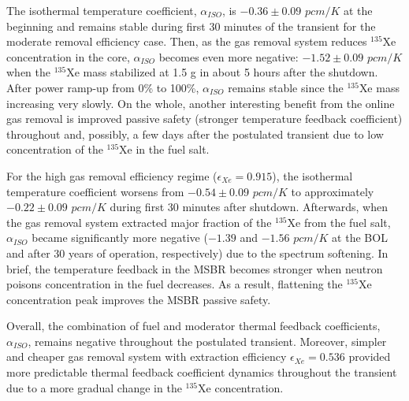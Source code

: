 The isothermal temperature coefficient, $\alpha_{ISO}$, is $-0.36\pm0.09$ 
$pcm/K$ at the beginning and remains stable during first 30 minutes of the 
transient for the moderate removal efficiency case.  Then, as the gas removal 
system reduces $^{135}$Xe concentration in the core, $\alpha_{ISO}$ becomes 
even more negative: $-1.52\pm0.09$ $pcm/K$ when the $^{135}$Xe mass stabilized 
at 1.5 g in about 5 hours after the shutdown. After power ramp-up from 0\% to 
100\%, $\alpha_{ISO}$ remains stable since the $^{135}$Xe mass increasing very 
slowly. On the whole, another interesting benefit from the online gas removal 
is improved passive safety (stronger temperature feedback coefficient) 
throughout and, possibly, a few days after the postulated transient due to low 
concentration of the $^{135}$Xe in the fuel salt.

For the high gas removal efficiency regime ($\epsilon_{Xe}=0.915$), the 
isothermal temperature coefficient worsens from $-0.54\pm0.09$ $pcm/K$ to 
approximately $-0.22\pm0.09$ $pcm/K$ during first 30 minutes after shutdown. 
Afterwards, when the gas removal system extracted major fraction of the 
$^{135}$Xe from the fuel salt, $\alpha_{ISO}$ became significantly more 
negative ($-1.39$ and $-1.56$ $pcm/K$ at the \gls{BOL} and after 30 years of 
operation, respectively) due to the spectrum softening. In brief, the 
temperature feedback in the \gls{MSBR} becomes stronger when neutron poisons 
concentration in the fuel decreases. As a result, flattening the $^{135}$Xe 
concentration peak improves the \gls{MSBR} passive safety.

Overall, the combination of fuel and moderator thermal feedback coefficients, 
$\alpha_{ISO}$, remains negative throughout the postulated transient. 
Moreover, simpler and cheaper gas removal system with extraction 
efficiency $\epsilon_{Xe}=0.536$ provided more predictable thermal feedback 
coefficient dynamics throughout the transient due to 
a more gradual change in the $^{135}$Xe concentration.

